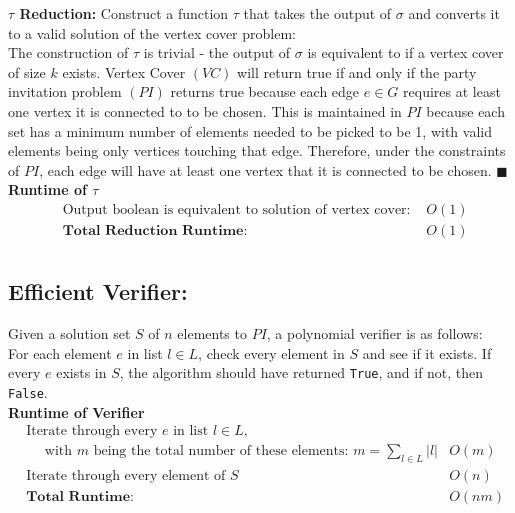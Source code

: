 \documentclass[11pt]{article}
\begin{document}
\textbf{$\tau$ Reduction:}
Construct a function $\tau$ that takes the output of $\sigma$ and converts it to a valid solution of the vertex cover problem:\\

The construction of $\tau$ is trivial - the output of $\sigma$ is equivalent to if a vertex cover of size $k$ exists. Vertex Cover $(VC)$  will return true if and only if the party invitation problem $(PI)$ returns true because each edge $e \in G$ requires at least one vertex it is connected to to be chosen. This is maintained in $PI$ because each set has a minimum number of elements needed to be picked to be 1, with valid elements being only vertices touching that edge. Therefore, under the constraints of $PI$, each edge will have at least one vertex that it is connected to be chosen. $\blacksquare$ \\

\textbf{Runtime of $\tau$ }
\begin{align*}
&\text{Output boolean is equivalent to solution of vertex cover: } &O(1)\\ 
&\textbf{Total Reduction Runtime: } &O(1)\\
\end{align*}


\subsection{Efficient Verifier:}
Given a solution set $S$ of $n$ elements to $PI$, a polynomial verifier is as follows:\\

For each element $e$ in list $l \in L$, check every element in $S$ and see if it exists. If every $e$ exists in $S$, the algorithm should have returned \texttt{True}, and if not, then \texttt{False}. \\

\textbf{Runtime of Verifier }
\begin{align*}
&\text{Iterate through every $e$ in list $l \in L$,}\\
&\text{$\quad$ with $m$ being the total number of these elements: $m = \sum_{l \in L} |l|$} &O(m)\\ 
&\text{Iterate through every element of $S$ } &O(n)\\ 
&\textbf{Total Runtime: } &O(nm)\\
\end{align*}

\begin{center}
\quad{}\quad{}\\
\end{center}
\end{document}

